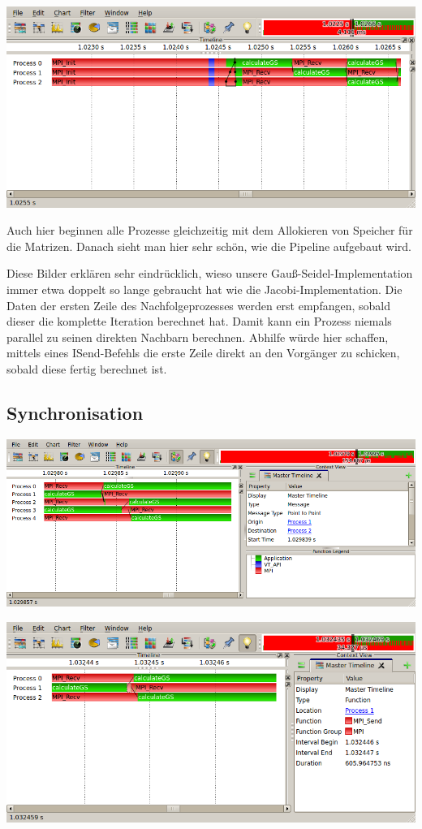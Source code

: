 \documentclass[a4paper]{article}
\begin{document}
\includegraphics[scale=0.7]{img/gs_3_2_start.png}

Auch hier beginnen alle Prozesse gleichzeitig mit dem Allokieren von Speicher für die Matrizen. Danach sieht man hier sehr schön, wie die Pipeline aufgebaut wird.

Diese Bilder erklären sehr eindrücklich, wieso unsere Gauß-Seidel-Implementation immer etwa doppelt so lange gebraucht hat wie die Jacobi-Implementation. Die Daten der ersten Zeile des Nachfolgeprozesses werden erst empfangen, sobald dieser die komplette Iteration berechnet hat. Damit kann ein Prozess niemals parallel zu seinen direkten Nachbarn berechnen. Abhilfe würde hier schaffen, mittels eines ISend-Befehls die erste Zeile direkt an den Vorgänger zu schicken, sobald diese fertig berechnet ist.
\subsection{Synchronisation}
\includegraphics[scale=0.85]{img/gs_5_4_synchro.png}

\includegraphics[scale=0.85]{img/gs_3_2_synchro.png}
\end{document}
